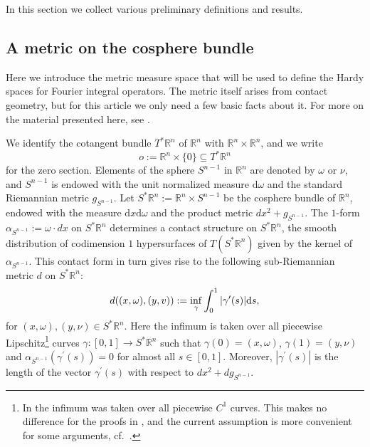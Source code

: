 \documentclass{amsart}
\newcommand {\ud}{\mathrm{d}}
\newcommand {\Rn}{\mathbb{R}^{n}}
\newcommand {\Sp}{S^{*}\Rn}
\newcommand {\w}{\omega}
\theoremstyle{definition}
\numberwithin{equation}{section}
\begin{document}
In this section we collect various preliminary definitions and results. %




	
\subsection{A metric on the cosphere bundle}\label{subsec:metric}

Here we introduce the metric measure space that will be used to define the Hardy spaces for Fourier integral operators. The metric itself arises from contact geometry, but for this article we only need a few basic facts about it. %
For more on the material presented here, see \cite[Section 2.1]{HaPoRo20}.

We identify the cotangent bundle $T^{*}\Rn$ of $\Rn$ with $\Rn\times\Rn$,  and we write 
\[
o:=\Rn\times\{0\}\subseteq T^{*}\Rn
\]
for the zero section. 
Elements of the sphere $S^{n-1}$ in $\Rn$ are denoted by $\w$ or $\nu$, and $S^{n-1}$ is endowed with the unit normalized measure $\ud\w$ and the standard Riemannian metric $g_{S^{n-1}}$. 
Let $\Sp:=\Rn\times S^{n-1}$ be the cosphere bundle of $\mathbb{R}^{n}$, endowed with the measure $\ud x\ud\w$ and the product metric $dx^{2}+g_{S^{n-1}}$. The $1$-form $\alpha_{S^{n-1}}:=\w\cdot dx$ on $\Sp$ determines a contact structure on $\Sp$, the smooth distribution of codimension $1$ hypersurfaces of $T(\Sp)$ given by the kernel of $\alpha_{S^{n-1}}$. %
This contact form in turn gives rise to the following sub-Riemannian metric $d$ on $\Sp$:
\[
d((x,\omega),(y,v)):={\rm \inf\limits_{\gamma}}\int_{0}^{1}|\gamma^{\prime}(s)|\ud s,
\]
for $(x,\omega),(y,\nu)\in \Sp$. Here the infimum is taken over all piecewise Lipschitz\footnote{In \cite{HaPoRo20} the infimum was taken over all piecewise $C^{1}$ curves. This makes no difference for the proofs in \cite{HaPoRo20}, and the current assumption is more convenient for some arguments, cf.~\cite{Hassell-Rozendaal23}.} curves $\gamma:[0,1]\rightarrow \Sp$ such that $\gamma(0)=(x,\omega)$, $\gamma(1)=(y,\nu)$ and $\alpha_{S^{n-1}}(\gamma^{\prime}(s))=0$ for almost all $s\in[0,1]$. Moreover, $|\gamma^{\prime}(s)|$ is the length of the vector $\gamma^{\prime}(s)$ with respect to $dx^{2}+dg_{S^{n-1}}$.
\end{document}

